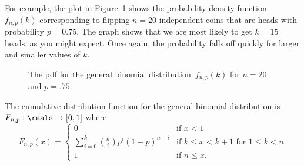 For example, the plot in Figure~\ref{fig:16F7} shows the probability
density function $f_{n, p}(k)$ corresponding to flipping $n=20$
independent coins that are heads with probability $p = 0.75$.  The
graph shows that we are most likely to get $k = 15$ heads, as
you might expect.  Once again, the probability falls off quickly for
larger and smaller values of $k$.
%
\begin{figure}


\caption{The pdf for the general binomial distribution~$f_{n, p}(k)$
  for $n = 20$ and $p = .75$.}

\label{fig:16F7}

\end{figure}

The cumulative distribution function for the general binomial
distribution is~$F_{n, p}: \reals \to [0,1]$ where
\begin{equation}\label{eqn:16F5}
F_{n, p}(x) =
    \begin{cases}
        0 & \text{if $x < 1$} \\
        \sum_{i = 0}^k \binom{n}{i} p^i (1 - p)^{n - i}
          & \text{if $k \le x < k + 1$ for $1 \le k < n$} \\
        1 & \text{if $n \le x$}.
    \end{cases}
\end{equation}


